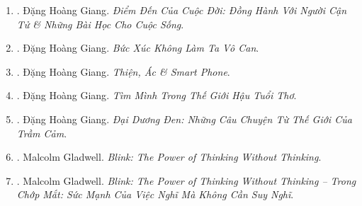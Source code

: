 \documentclass{article}
\begin{document}
\begin{enumerate}
\begin{itemize}
		-- Những yếu tố thiết yếu nhất để có được hạnh phúc trong cuộc sống này là có việc gì đó để làm, có điều gì đó để yêu thương, có điều gì đó để hy vọng.
		\item {\it``Concentrating on 1 thing at a time may be the single most important factor in achieving flow.''}

		-- Tập trung vào 1 việc tại 1 thời điểm có thể là yếu tố quan trọng nhất để đạt được dòng chảy.
		\item {\it``We are what we repeatedly do. Excellence, then, is not an act but a habit.''}

		-- Chúng ta là những gì chúng ta làm đi làm lại nhiều lần. Vì vậy, sự xuất sắc không phải là 1 hành động mà là 1 thói quen.
		\item {\it``He who has a why to live for can bear with almost any how.''}

		-- Người có lý do để sống có thể chịu đựng được hầu hết mọi việc.
	\end{itemize}

	\item \cite{Giang_death}. {\sc Đặng Hoàng Giang}. {\it Điểm Đến Của Cuộc Đời: Đồng Hành Với Người Cận Tử \& Những Bài Học Cho Cuộc Sống}.\hfill{\sf[done]}

	\item \cite{Giang_buc_xuc}. {\sc Đặng Hoàng Giang}. {\it Bức Xúc Không Làm Ta Vô Can}.\hfill{\sf[done]}

	\item \cite{Giang_smartphone}. {\sc Đặng Hoàng Giang}. {\it Thiện, Ác \& Smart Phone}.\hfill{\sf[done]}

	\item \cite{Giang_after_childhood2022, Giang_after_childhood2024}. {\sc Đặng Hoàng Giang}. {\it Tìm Mình Trong Thế Giới Hậu Tuổi Thơ}.\hfill{\sf[done]}

	\item \cite{Giang_dai_duong_den}. {\sc Đặng Hoàng Giang}. {\it Đại Dương Đen: Những Câu Chuyện Từ Thế Giới Của Trầm Cảm}.\hfill{\sf[done]}

	\item \cite{Gladwell_blink}. {\sc Malcolm Gladwell}. {\it Blink: The Power of Thinking Without Thinking}.\hfill{\sf[reading]}

	\item \cite{Gladwell_blink_VN}. {\sc Malcolm Gladwell}. {\it Blink: The Power of Thinking Without Thinking -- Trong Chớp Mắt: Sức Mạnh Của Việc Nghĩ Mà Không Cần Suy Nghĩ}.\hfill{\sf[done]}


\end{enumerate}
\end{document}
